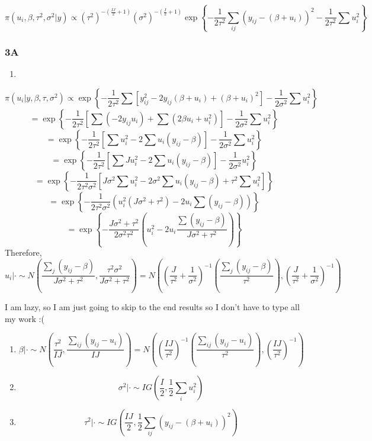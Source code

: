\documentclass[]{article}
\begin{document}
\[\pi(u_i,\beta,\tau^2,\sigma^2|y) \propto (\tau^2)^{-\left(\frac{IJ}{2}+1\right)} (\sigma^2)^{-\left(\frac{I}{2}+1\right)}\exp\left\{-\frac{1}{2\tau^2} \sum_{ij} \left(y_{ij} - (\beta + u_i)\right)^2  - \frac{1}{2\tau^2} \sum u_i^2 \right\} \]

\subsubsection{3A}\label{a-2}

\begin{enumerate}
\def\labelenumi{\roman{enumi})}
\item
\end{enumerate}

\[\pi(u_i|y,\beta,\tau,\sigma^2) \propto \exp \left\{-\frac{1}{2\tau^2} \sum \left[y^2_{ij} - 2y_{ij}(\beta + u_i) + (\beta + u_i)^2 \right] - \frac{1}{2\sigma^2} \sum u_i^2 \right\} \]
\[= \exp\left\{-\frac{1}{2\tau^2}\left[\sum (-2y_{ij}u_i) + \sum (2\beta u_i + u_i^2) \right] - \frac{1}{2\sigma^2}\sum u_i^2\right\} \]
\[= \exp\left\{-\frac{1}{2\tau^2}\left[\sum u_i^2 - 2 \sum u_i(y_{ij} - \beta) \right] - \frac{1}{2\sigma^2} \sum u_i^2 \right\} \]
\[= \exp\left\{-\frac{1}{2\tau^2} \left[\sum Ju_i^2 - 2 \sum u_i(y_{ij} -\beta) \right] - \frac{1}{2\sigma^2} u_i^2 \right\} \]
\[ = \exp \left\{-\frac{1}{2\tau^2\sigma^2} \left[J\sigma^2 \sum u_i^2 - 2\sigma^2 \sum u_i(y_{ij} - \beta) + \tau^2 \sum u_i^2 \right] \right\}\]
\[ = \exp\left\{-\frac{1}{2\tau^2\sigma^2} \left(u_i^2 \left(J\sigma^2 + \tau^2 \right) -2 u_i \sum (y_{ij} -\beta) \right) \right\} \]
\[ = \exp\left\{-\frac{J\sigma^2 +\tau^2}{2\sigma^2\tau^2 }\left(u_i^2 - 2u_i \frac{\sum (y_{ij} -\beta)}{J\sigma^2 + \tau^2} \right) \right\} \]
Therefore,
\[ u_i | \cdot \sim N\left(\frac{\sum_j (y_{ij} -\beta)}{J\sigma^2 + \tau^2}, \frac{\tau^2\sigma^2}{J\sigma^2 + \tau^2} \right) = N\left(\left(\frac{J}{\tau^2} + \frac{1}{\sigma^2} \right)^{-1} \left(\frac{\sum_j (y_{ij} - \beta)}{\tau^2} \right), \left(\frac{J}{\tau^2} + \frac{1}{\sigma^2} \right)^{-1} \right)\]

I am lazy, so I am just going to skip to the end results so I don't have
to type all my work :(

\begin{enumerate}
\def\labelenumi{\roman{enumi})}
\setcounter{enumi}{1}
\item
  \[\beta|\cdot \sim N\left(\frac{\tau^2}{IJ}, \frac{\sum_{ij} (y_{ij} - u_i)}{IJ} \right) = N\left(\left(\frac{IJ}{\tau^2} \right)^{-1} \left(\frac{\sum_{ij} (y_{ij} - u_i)}{\tau^2}\right), \left(\frac{IJ}{\tau^2} \right)^{-1} \right) \]
\item
  \[\sigma^2|\cdot \sim IG\left(\frac{I}{2}, \frac{1}{2} \sum_i u_i^2 \right) \]
\item
  \[ \tau^2|\cdot \sim IG \left( \frac{IJ}{2}, \frac{1}{2} \sum_{ij} (y_{ij} - (\beta + u_i))^2 \right) \]
\end{enumerate}
\end{document}
